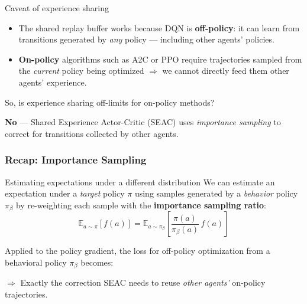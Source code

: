 \begin{frame}{Caveat of experience sharing}

\begin{itemize}
    \item The shared replay buffer works because DQN is
    \textbf{off-policy}: it can learn from transitions generated by
    \emph{any} policy --- including other agents' policies.
    \item \textbf{On-policy} algorithms such as A2C or PPO require
    trajectories sampled from the \emph{current} policy being
    optimized $\Rightarrow$ we cannot directly feed them
    other agents' experience.
\end{itemize}

\vspace{0.8em}
\centering
So, is experience sharing off-limits for on-policy methods?

\vspace{0.3em}
\textbf{No} --- Shared Experience Actor-Critic (SEAC) uses
\emph{importance sampling} to correct for transitions collected by
other agents.

\end{frame}

\begin{frame}
\frametitle{Recap: Importance Sampling~\cite{sutton2018reinforcement}}

\begin{block}{Estimating expectations under a different distribution}
We can estimate an expectation under a \emph{target} policy $\pi$ using
samples generated by a \emph{behavior} policy $\pi_\beta$ by re-weighting
each sample with the \textbf{importance sampling ratio}:
\[
\mathbb{E}_{a \sim \pi}\!\left[ f(a) \right]
=
\mathbb{E}_{a \sim \pi_\beta}\!\left[
\frac{\pi(a)}{\pi_\beta(a)} \, f(a)
\right]
\]
\end{block}

\vspace{0.4em}
Applied to the policy gradient, the loss for off-policy optimization
from a behavioral policy $\pi_\beta$ becomes:
\begin{center}
\end{center}

\vspace{0.4em}
\centering
$\Rightarrow$ Exactly the correction SEAC needs to reuse
\emph{other agents'} on-policy trajectories.

\end{frame}

